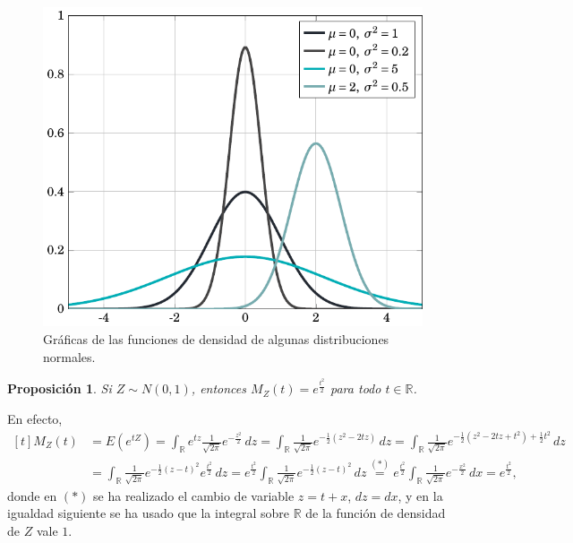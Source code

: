 \documentclass[11pt]{report}
\makeatletter
\renewenvironment{proof}[1][\proofname]{\par
  \pushQED{\qed}%
  \normalfont \topsep\z@skip %
  \trivlist
  \item[\hskip\labelsep
        \itshape
    #1\@addpunct{.}]\ignorespaces
}{%
  \popQED\endtrivlist\@endpefalse
}
\newtheorem{proposition}{Proposición}
\theoremstyle{definition}
\newcommand{\R}{\mathbb R}
\makeatother
\begin{document}
\begin{figure}[H]
    \centering
    \includegraphics{ie_plot_normal.pdf}
    \caption{Gráficas de las funciones de densidad de algunas distribuciones normales.}
\end{figure}

\begin{proposition}
Si $Z \sim N(0,1)$, entonces $M_Z(t) = e^{\frac{t^2}{2}}$ para todo $t \in \R$.
\end{proposition}

\begin{proof}
En efecto,
    \[
    \begin{aligned}[t]
    M_Z(t) &= E(e^{tZ}) = \int_{\R} e^{tz}\frac{1}{\sqrt{2\pi}}e^{-\frac{z^2}{2}} \, dz = \int_{\R} \frac{1}{\sqrt{2\pi}}e^{-\frac{1}{2}(z^2-2tz)} \, dz =\int_{\R} \frac{1}{\sqrt{2\pi}}e^{-\frac{1}{2}(z^2-2tz+t^2)+\frac{1}{2}t^2} \, dz \\
    &= \int_{\R} \frac{1}{\sqrt{2\pi}}e^{-\frac{1}{2}(z-t)^2}e^{\frac{t^2}{2}} \, dz = e^{\frac{t^2}{2}}\int_{\R} \frac{1}{\sqrt{2\pi}}e^{-\frac{1}{2}(z-t)^2} \, dz \overset{(\ast)}{=} e^{\frac{t^2}{2}} \int_{\R}\frac{1}{\sqrt{2\pi}} e^{-\frac{x^2}{2}} \, dx = e^{\frac{t^2}{2}},
    \end{aligned}
    \]
    donde en $(\ast)$ se ha realizado el cambio de variable $z=t+ x$, $dz =dx $, y en la igualdad siguiente se ha usado que la integral sobre $\R$ de la función de densidad de $Z$ vale $1$.
\end{proof}
\end{document}
